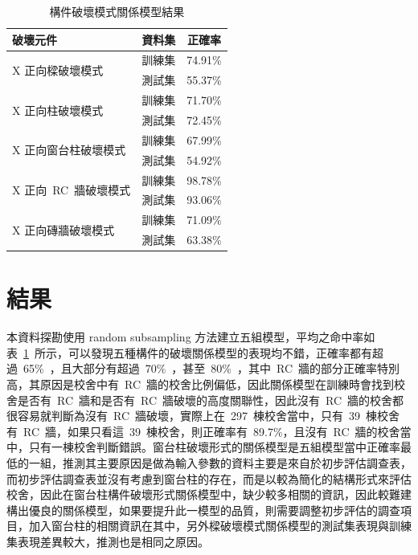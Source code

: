 

\setlength{\tabcolsep}{2em}
{\renewcommand{\arraystretch}{1.5}
\begin{table}[hbtp]
  \begin{center}
    \caption{構件破壞模式關係模型結果}
    \label{tab:comp_result}
    \begin{tabular}{l c c}
    	\hline
    	破壞元件 & 資料集 & 正確率 \\
    	\hline
    	\multirow{2}{*}{X 正向樑破壞模式} & 訓練集 & 74.91\% \\
    	\cline{2-3} & 測試集 & 55.37\% \\
    	\hline
    	\multirow{2}{*}{X 正向柱破壞模式} & 訓練集 & 71.70\% \\
    	\cline{2-3} & 測試集 & 72.45\% \\
    	\hline
    	\multirow{2}{*}{X 正向窗台柱破壞模式} & 訓練集 & 67.99\% \\
    	\cline{2-3} & 測試集 & 54.92\% \\
    	\hline
    	\multirow{2}{*}{X 正向~RC~牆破壞模式} & 訓練集 & 98.78\% \\
    	\cline{2-3} & 測試集 & 93.06\% \\
    	\hline
    	\multirow{2}{*}{X 正向磚牆破壞模式} & 訓練集 & 71.09\% \\
    	\cline{2-3} & 測試集 & 63.38\% \\
    	\hline
    \end{tabular}
  \end{center}
\end{table}
}

\section{結果}

本資料探勘使用 random subsampling 方法建立五組模型，平均之命中率如表~\ref{tab:comp_result}~所示，可以發現五種構件的破壞關係模型的表現均不錯，正確率都有超過~65\%~，且大部分有超過~70\%~，甚至~80\%~，其中~RC~牆的部分正確率特別高，其原因是校舍中有~RC~牆的校舍比例偏低，因此關係模型在訓練時會找到校舍是否有~RC~牆和是否有~RC~牆破壞的高度關聯性，因此沒有~RC~牆的校舍都很容易就判斷為沒有~RC~牆破壞，實際上在~297~棟校舍當中，只有~39~棟校舍有~RC~牆，如果只看這~39~棟校舍，則正確率有~89.7\%，且沒有~RC~牆的校舍當中，只有一棟校舍判斷錯誤。窗台柱破壞形式的關係模型是五組模型當中正確率最低的一組，推測其主要原因是做為輸入參數的資料主要是來自於初步評估調查表，而初步評估調查表並沒有考慮到窗台柱的存在，而是以較為簡化的結構形式來評估校舍，因此在窗台柱構件破壞形式關係模型中，缺少較多相關的資訊，因此較難建構出優良的關係模型，如果要提升此一模型的品質，則需要調整初步評估的調查項目，加入窗台柱的相關資訊在其中，另外樑破壞模式關係模型的測試集表現與訓練集表現差異較大，推測也是相同之原因。

